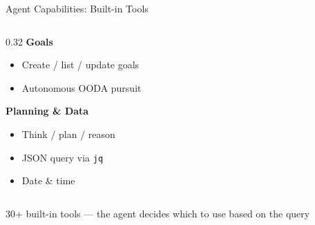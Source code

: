 \documentclass[aspectratio=169,10pt]{beamer}
\begin{document}
\begin{frame}{Agent Capabilities: Built-in Tools}
\begin{columns}[T]
\begin{column}{0.32\textwidth}
\smallskip
\textbf{\color{rhteal}Goals}
\begin{itemize}\scriptsize\setlength{\itemsep}{0pt}
  \item Create / list / update goals
  \item Autonomous OODA pursuit
\end{itemize}

\smallskip
\textbf{\color{rhdarkgray}Planning \& Data}
\begin{itemize}\scriptsize\setlength{\itemsep}{0pt}
  \item Think / plan / reason
  \item JSON query via \texttt{jq}
  \item Date \& time
\end{itemize}
\end{column}
\end{columns}

\vfill
\centering
\scriptsize\color{gray} 30+ built-in tools --- the agent decides which to use based on the query
\end{frame}
\end{document}
